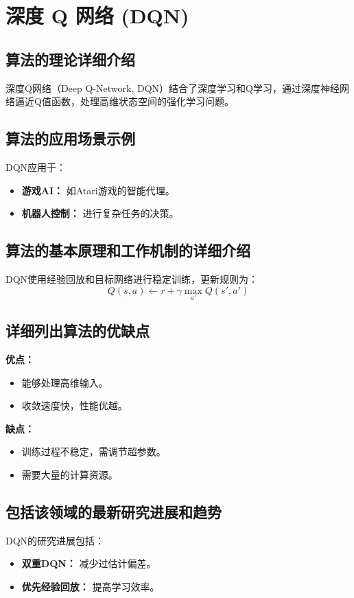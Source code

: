 \section{深度 Q 网络 (DQN)}
\subsection*{算法的理论详细介绍}
深度Q网络（Deep Q-Network, DQN）结合了深度学习和Q学习，通过深度神经网络逼近Q值函数，处理高维状态空间的强化学习问题。

\subsection*{算法的应用场景示例}
DQN应用于：
\begin{itemize}
    \item \textbf{游戏AI：} 如Atari游戏的智能代理。
    \item \textbf{机器人控制：} 进行复杂任务的决策。
\end{itemize}

\subsection*{算法的基本原理和工作机制的详细介绍}
DQN使用经验回放和目标网络进行稳定训练，更新规则为：
\[
    Q(s, a) \leftarrow r + \gamma \max_{a'} Q(s', a')
\]

\subsection*{详细列出算法的优缺点}
\textbf{优点：}
\begin{itemize}
    \item 能够处理高维输入。
    \item 收敛速度快，性能优越。
\end{itemize}

\textbf{缺点：}
\begin{itemize}
    \item 训练过程不稳定，需调节超参数。
    \item 需要大量的计算资源。
\end{itemize}

\subsection*{包括该领域的最新研究进展和趋势}
DQN的研究进展包括：
\begin{itemize}
    \item \textbf{双重DQN：} 减少过估计偏差。
    \item \textbf{优先经验回放：} 提高学习效率。
\end{itemize}
